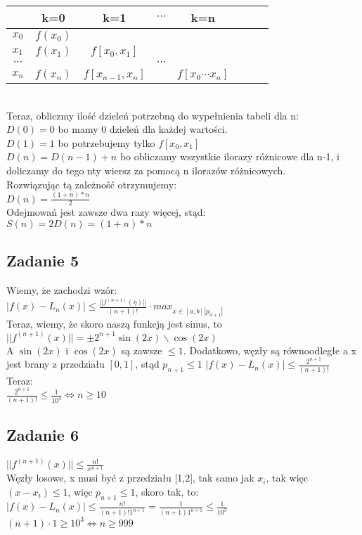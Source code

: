 \documentclass[a4paper]{article}
\begin{document}
\begin{tabular}{|c *{6}{|c} |c|}\hline
 & k=0 & k=1 & $\cdots$ & k=n\\
\hline 
$x_0$ & $f(x_0)$  &  &  &  \\
\hline
$x_1$ & $f(x_1)$ & $f[x_0,x_1]$ &  & \\
\hline
$\cdots$ &  &  & $\cdots$ & \\
\hline
$x_n$ & $f(x_n)$  & $f[x_{n-1}, x_n]$  &  & $f[x_0\cdots x_n]$ \\
\hline
\end{tabular}\\

Teraz, obliczmy ilość dzieleń potrzebną do wypełnienia tabeli dla n:\\
$D(0) = 0$ bo mamy 0 dzieleń dla każdej wartości.\\
$D(1) = 1$ bo potrzebujemy tylko $f[x_0,x_1]$\\
$D(n) = D(n-1) + n$ bo obliczamy wszystkie ilorazy różnicowe dla n-1, i doliczamy do tego nty wiersz za pomocą n ilorazów różnicowych.\\
Rozwiązując tą zależność otrzymujemy:\\
$D(n)=\frac{(1+n)*n}{2}$\\
Odejmowań jest zawsze dwa razy więcej, stąd:\\
$S(n)=2D(n)=(1+n)*n$\\


\subsection*{Zadanie 5}
Wiemy, że zachodzi wzór:\\
$|f(x)-L_n(x)| \leq \frac{||f^{(n+1)}(\eta)||}{(n+1)!} \cdot max_{x \in [a,b]|p_{n+1}|}$\\
Teraz, wiemy, że skoro naszą funkcją jest sinus, to $||f^{(n+1)}(x)|| = \pm 2^{n+1} \sin(2x)  \backslash \cos(2x)$\\
A $\sin(2x)$ i $\cos(2x)$ są zawsze $\leq 1$. Dodatkowo, węzły są równoodległe a x jest brany z przedziału $[0,1]$, stąd $p_{n+1} \leq 1$
$|f(x)-L_n(x)| \leq \frac{2^{n+1}}{(n+1)!}$\\
Teraz:\\
$\frac{2^{n+1}}{(n+1)!} \leq \frac{1}{10^4} \Leftrightarrow n\geq 10$\\

\subsection*{Zadanie 6}
$||f^{(n+1)}(x)|| \leq \frac{n!}{x^{n+1}}$\\
Węzły losowe, x musi być z przedziału [1,2], tak samo jak $x_i$, tak więc $(x-x_i) \leq 1$, więc $p_{n+1} \leq 1$, skoro tak, to:\\
$|f(x)-L_n(x)| \leq \frac{n!}{(n+1)!1^{n+1}} = \frac{1}{(n+1)1^{n+1}} \leq \frac{1}{10^3}$\\
$(n+1)\cdot 1 \geq 10^3  \Leftrightarrow  n \geq 999$
\end{document}

